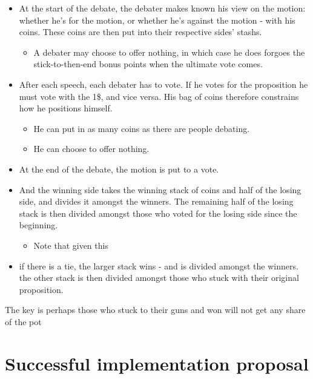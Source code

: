\documentclass[9pt]{article}
\begin{document}
\begin{itemize}
    \item At the start of the debate, the debater makes known his view on the motion: whether he's for the motion, or whether he's against the motion - with his coins. These coins are then put into their respective sides' stashs.
    \begin{itemize}
        \item A debater may choose to offer nothing, in which case he does forgoes the stick-to-then-end bonus points when the ultimate vote comes.
    \end{itemize}
    \item After each speech, each debater has to vote. If he votes for the proposition he must vote with the 1\$, and vice versa. His bag of coins therefore constrains how he positions himself.
    \begin{itemize}
        \item He can put in as many coins as there are people debating.
        \item He can choose to offer nothing.
    \end{itemize}
    \item At the end of the debate, the motion is put to a vote.
    \item And the winning side takes the winning stack of coins and half of the losing side, and divides it amongst the winners. The remaining half of the losing stack is then divided amongst those who voted for the losing side since the beginning.
    \begin{itemize}
        \item Note that given this
    \end{itemize}
    \item if there is a tie, the larger stack wins - and is divided amongst the winners. the other stack is then divided amongst those who stuck with their original proposition.
\end{itemize}

The key is perhaps those who stuck to their guns and won will not get any share of the pot

\section{Successful implementation proposal}
\end{document}
